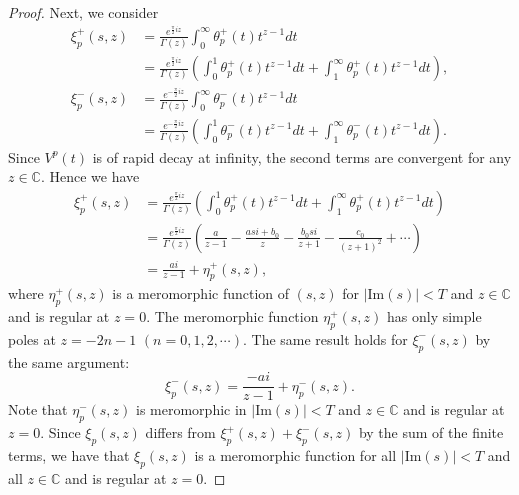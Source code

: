 \begin{proof}
Next, we consider
\begin{equation*}
    \begin{split}
        \xi_{p}^{+}(s,z) &= \frac{e^{\frac{\pi}{2}iz}}{\Gamma(z)} \int_{0}^{\infty}\theta_{p}^{+}(t)t^{z-1}dt \\
        &= \frac{e^{\frac{\pi}{2}iz}}{\Gamma(z)} \left( \int_{0}^{1}\theta_{p}^{+}(t)t^{z-1}dt + \int_{1}^{\infty}\theta_{p}^{+}(t)t^{z-1}dt \right), \\
        \xi_{p}^{-}(s,z) &= \frac{e^{-\frac{\pi}{2}iz}}{\Gamma(z)} \int_{0}^{\infty}\theta_{p}^{-}(t)t^{z-1}dt \\
        &= \frac{e^{-\frac{\pi}{2}iz}}{\Gamma(z)} \left( \int_{0}^{1}\theta_{p}^{-}(t)t^{z-1}dt + \int_{1}^{\infty}\theta_{p}^{-}(t)t^{z-1}dt \right).
    \end{split}
\end{equation*}
Since $V^{p}(t)$ is of rapid decay at infinity, the second terms are convergent for any $z\in\mathbb{C}$.
Hence we have
\begin{equation*}
    \begin{split}
        \xi_{p}^{+}(s,z) &= \frac{e^{\frac{\pi}{2}iz}}{\Gamma(z)} \left( \int_{0}^{1}\theta_{p}^{+}(t)t^{z-1}dt + \int_{1}^{\infty}\theta_{p}^{+}(t)t^{z-1}dt \right) \\
        &= \frac{e^{\frac{\pi}{2}iz}}{\Gamma(z)} \left ( \frac{a}{z-1} - \frac{asi + b_{0}}{z} - \frac{b_{0}si}{z+1} - \frac{c_{0}}{(z+1)^{2}} + \cdots \right) \\
        &= \frac{ai}{z-1} + \eta_{p}^{+}(s,z),
    \end{split}
\end{equation*}
where $\eta_{p}^{+}(s,z)$ is a meromorphic function of $(s,z)$ for $|\mathrm{Im}(s)|<T$ and $z\in\mathbb{C}$ and is regular at $z=0$.
The meromorphic function $\eta_{p}^{+}(s,z)$ has only simple poles at $z=-2n-1$ $(n=0,1,2,\cdots)$. 
The same result holds for $\xi_{p}^{-}(s,z)$ by the same argument:
\begin{equation*}
    \xi_{p}^{-}(s,z) = \frac{-ai}{z-1} + \eta_{p}^{-}(s,z).
\end{equation*}
Note that $\eta_{p}^{-}(s,z)$ is meromorphic in $|\mathrm{Im}(s)|<T$ and $z\in\mathbb{C}$ and is regular at $z=0$.
Since $\xi_{p}(s,z)$ differs from $\xi_{p}^{+}(s,z)+\xi_{p}^{-}(s,z)$ by the sum of the finite terms, we have that $\xi_{p}(s,z)$ is a meromorphic function for all $|\mathrm{Im}(s)|<T$ and all $z\in\mathbb{C}$ and is regular at $z=0$.
\end{proof}



